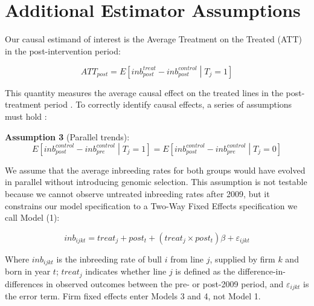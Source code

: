 \documentclass[12pt,letterpaper]{article}
\begin{document}


\section{Additional Estimator Assumptions}
\label{app:estimator}
Our causal estimand of interest is the Average Treatment on the Treated (ATT) in the post-intervention period:

\begin{equation*}
    ATT_{post}=E\left[inb_{post}^{treat}-inb_{post}^{control} \middle| T_{j}=1\right]
\end{equation*}

This quantity measures the average causal effect on the treated lines in the post-treatment period \citep{Roth2023}. To correctly identify causal effects, a series of assumptions must hold \citep{Sun2021}:

\medskip
\textbf{Assumption 3} (Parallel trends): 
\begin{equation*}
    E\left[inb_{post}^{control}-inb_{pre}^{control}\middle| T_{j}=1\right] = E\left[inb_{post}^{control}-inb_{pre}^{control} \middle| T_{j}=0\right]
\end{equation*}

We assume that the average inbreeding rates for both groups would have evolved in parallel without introducing genomic selection. This assumption is not testable because we cannot observe untreated inbreeding rates after 2009, but it constrains our model specification to a Two-Way Fixed Effects specification we call Model (1):

\begin{equation}
inb_{ijkt} = treat_{j}+post_{t}+(treat_{j}\times post_{t})\beta+\varepsilon_{ijkt}\tag{Model 1}
\end{equation}

Where $inb_{ijkt}$ is the inbreeding rate of bull $i$ from line $j$, supplied by firm $k$ and born in year $t$; $treat_{j}$ indicates whether line $ j$ is defined as the difference-in-differences in observed outcomes between the pre- or post-2009 period, and $\varepsilon_{ijkt}$ is the error term. Firm fixed effects enter Models 3 and 4, not Model 1. 
\end{document}
